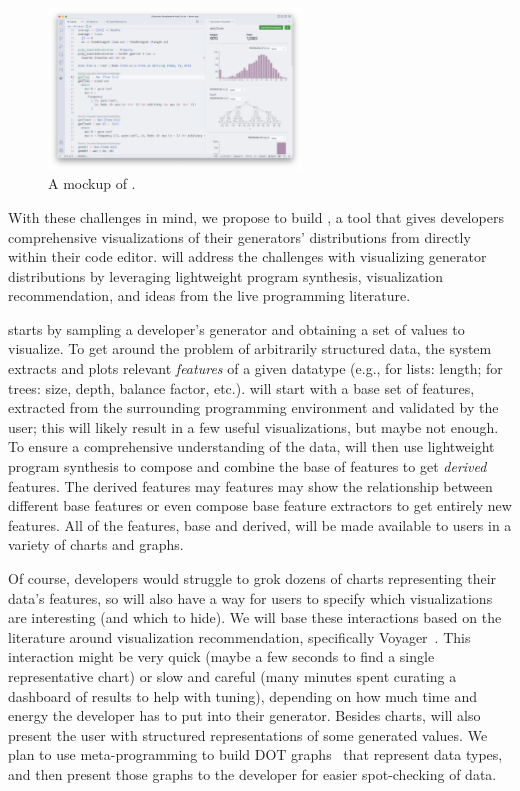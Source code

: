 \begin{figure}
  \centering
  \includegraphics[width=0.6\textwidth]{assets/gen-vis.png}
  \caption{A mockup of \genvis.}\label{fig:gen-vis}
\end{figure}

With these challenges in mind, we propose to build \genvis, a tool that
gives developers comprehensive visualizations of their generators' distributions
from directly within their code editor. \genvis{} will address the challenges
with visualizing generator distributions by leveraging lightweight program
synthesis, visualization recommendation, and ideas from the live programming
literature.

\genvis{} starts by sampling a developer's generator and obtaining a set of
values to visualize. To get around the problem of arbitrarily structured data,
the system extracts and plots relevant {\em features} of a given datatype (e.g.,
for lists: length; for trees: size, depth, balance factor, etc.). \genvis{} will
start with a base set of features, extracted from the surrounding programming
environment and validated by the user; this will likely result in a few useful
visualizations, but maybe not enough. To ensure a comprehensive understanding of
the data, \genvis{} will then use lightweight program synthesis to compose and
combine the base of features to get {\em derived} features. The derived features
may features may show the relationship between different base features or even
compose base feature extractors to get entirely new features. All of the
features, base and derived, will be made available to users in a variety of
charts and graphs.

Of course, developers would struggle to grok dozens of charts representing
their data's features, so \genvis{} will also have a way for users to specify
which visualizations are interesting (and which to hide). We will base these
interactions based on the literature around visualization recommendation,
specifically Voyager~\cite{wongsuphasawat_voyager_2016,
wongsuphasawat_voyager_2017}. This interaction might be very quick (maybe a few
seconds to find a single representative chart) or slow and careful (many minutes
spent curating a dashboard of results to help with tuning), depending on how
much time and energy the developer has to put into their generator. Besides
charts, \genvis{} will also present the user with structured representations of
some generated values. We plan to use meta-programming to build
DOT graphs~\cite{ellson_graphviz_2002} that represent data types, and then
present those graphs to the developer for easier spot-checking of data.

